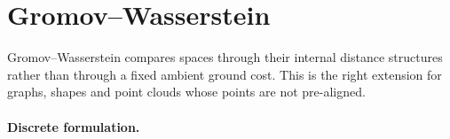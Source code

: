 \section{Gromov--Wasserstein}
\label{sec-gromov-wasserstein}

Gromov--Wasserstein compares spaces through their internal distance structures rather than through a fixed ambient ground cost. This is the right extension for graphs, shapes and point clouds whose points are not pre-aligned.

\paragraph{Discrete formulation.}


